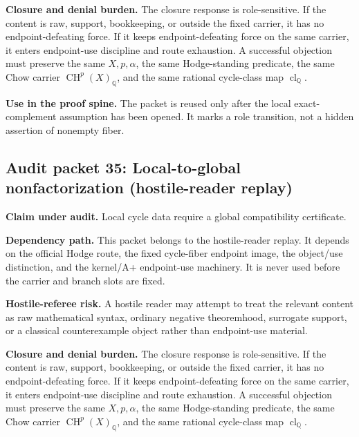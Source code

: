 \documentclass[11pt]{article}
\newcommand{\QQ}{\mathbb{Q}}
\newcommand{\CH}{\operatorname{CH}}
\newcommand{\clQ}{\operatorname{cl}_{\QQ}}
\begin{document}
\par\noindent\textbf{Closure and denial burden.} The closure response is role-sensitive. If the content is raw, support, bookkeeping, or outside the fixed carrier, it has no endpoint-defeating force. If it keeps endpoint-defeating force on the same carrier, it enters endpoint-use discipline and route exhaustion. A successful objection must preserve the same $X,p,\alpha$, the same Hodge-standing predicate, the same Chow carrier $\CH^p(X)_\QQ$, and the same rational cycle-class map $\clQ$.


\par\noindent\textbf{Use in the proof spine.} The packet is reused only after the local exact-complement assumption has been opened. It marks a role transition, not a hidden assertion of nonempty fiber.


\subsection{Audit packet 35: Local-to-global nonfactorization (hostile-reader replay)}


\par\noindent\textbf{Claim under audit.} Local cycle data require a global compatibility certificate.


\par\noindent\textbf{Dependency path.} This packet belongs to the hostile-reader replay. It depends on the official Hodge route, the fixed cycle-fiber endpoint image, the object/use distinction, and the kernel/A+ endpoint-use machinery. It is never used before the carrier and branch slots are fixed.


\par\noindent\textbf{Hostile-referee risk.} A hostile reader may attempt to treat the relevant content as raw mathematical syntax, ordinary negative theoremhood, surrogate support, or a classical counterexample object rather than endpoint-use material.


\par\noindent\textbf{Closure and denial burden.} The closure response is role-sensitive. If the content is raw, support, bookkeeping, or outside the fixed carrier, it has no endpoint-defeating force. If it keeps endpoint-defeating force on the same carrier, it enters endpoint-use discipline and route exhaustion. A successful objection must preserve the same $X,p,\alpha$, the same Hodge-standing predicate, the same Chow carrier $\CH^p(X)_\QQ$, and the same rational cycle-class map $\clQ$.
\end{document}
